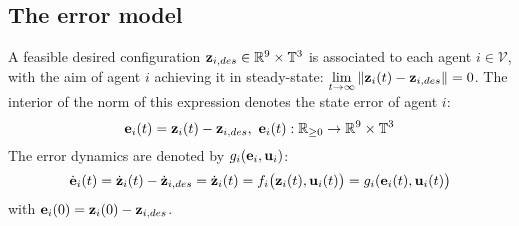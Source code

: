 \subsection{The error model}

A feasible desired configuration
$\bm{\mathbf{z}}_{i,des} \in \mathbb{R}^9 \times \mathbb{T}^3$
is associated to each agent $i \in \mathcal{V}$, with the aim of agent $i$
achieving it in steady-state:
$\lim\limits_{t \to \infty} \|\bm{\mathbf{z}}_i(t) - \bm{\mathbf{z}}_{i,des}\| = 0$. The
interior of the norm of this expression denotes the state error of agent $i$:
$$\bm{\mathbf{e}}_i(t) = \bm{\mathbf{z}}_i(t) - \bm{\mathbf{z}}_{i,des},\ \bm{\mathbf{e}}_i(t) :
\mathbb{R}_{\geq 0} \to \mathbb{R}^9 \times \mathbb{T}^3$$
The error dynamics are denoted by $g_i(\bm{\mathbf{e}}_i, \bm{\mathbf{u}}_i)$:
\begin{align}
  \dot{\bm{\mathbf{e}}}_i(t) = \dot{\bm{\mathbf{z}}}_i(t) - \dot{\bm{\mathbf{z}}}_{i,des} =
  \dot{\bm{\mathbf{z}}}_i(t) = f_i\big(\bm{\mathbf{z}}_i(t), \bm{\mathbf{u}}_i(t)\big) = g_i(\bm{\mathbf{e}}_i(t), \bm{\mathbf{u}}_i(t)\big)
  \label{eq:position_based_error_model}
\end{align}
with $\bm{\mathbf{e}}_i(0) = \bm{\mathbf{z}}_i(0) - \bm{\mathbf{z}}_{i,des}$.
